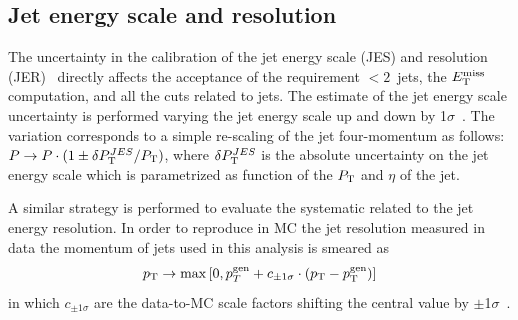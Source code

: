 
\subsection{Jet energy scale and resolution}

The uncertainty in the calibration of the jet energy scale (JES) and resolution (JER)~\cite{Collaboration2011} 
directly affects the acceptance of the requirement $< 2$~jets, 
the $E_\mathrm{T}^{\mathrm{miss}}$ computation, and all the cuts related to jets. 
The estimate of the jet energy scale uncertainty is performed varying 
the jet energy scale up and down by 1$\sigma$~\cite{twiki:JES}. The variation
corresponds to a simple re-scaling of the jet four-momentum as
follows: $P\rightarrow P \cdot (1 \pm \delta P_\mathrm{T}^{JES}/{P_\mathrm{T}})$, where 
$\delta P_\mathrm{T}^{JES}$ is the absolute uncertainty on the jet energy scale
which is parametrized as function of the $P_\mathrm{T}$ and $\eta$ of the jet. 

A similar strategy is performed to evaluate the systematic related to
the jet energy resolution. In order to reproduce in MC the jet
resolution measured in data the momentum of jets used in this 
analysis is smeared as 
\begin{equation}
p_{\rm T} \rightarrow \max \left[0 , p_{T}^{\rm gen} + c_{\pm1\sigma}\cdot (p_{\rm T}-p_{\rm T}^{\rm gen}) \right]
\end{equation}
in which $c_{\pm1\sigma}$ are the data-to-MC scale factors 
shifting the central value by $\pm$1$\sigma$~\cite{twiki:JES}. 



